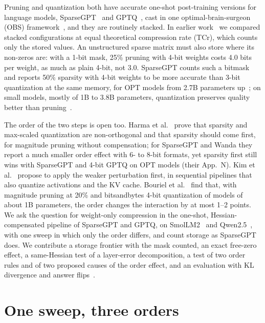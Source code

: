 \documentclass{esannV2}
\begin{document}
Pruning and quantization both have accurate one-shot post-training versions
for language models, SparseGPT~\cite{frantar2023sparsegpt} and
GPTQ~\cite{frantar2023gptq}, cast in one optimal-brain-surgeon (OBS)
framework~\cite{frantar2022obc}, and they are routinely stacked. In earlier
work~\cite{laborde2025semantic} we compared stacked configurations at equal
theoretical compression rate (TCr), which counts only the stored values. An
unstructured sparse matrix must also store where its non-zeros are: with a
1-bit mask, 25\% pruning with 4-bit weights costs 4.0 bits per weight, as
much as plain 4-bit, not 3.0. SparseGPT counts such a bitmask and reports 50\%
sparsity with 4-bit weights to be more accurate than 3-bit quantization at the
same memory, for OPT models from 2.7B parameters
up~\cite{frantar2023sparsegpt}; on small models, mostly of 1B to 3.8B
parameters, quantization preserves quality better than
pruning~\cite{zhou2025revisiting}.

The order of the two steps is open too. Harma et
al.~\cite{harma2025interplay} prove that sparsity and max-scaled quantization
are non-orthogonal and that sparsity should come first, for magnitude pruning
without compensation; for SparseGPT and Wanda they report a much smaller
order effect with 6- to 8-bit formats, yet sparsity first still wins with
SparseGPT and 4-bit GPTQ on OPT models (their App.~N). Kim et
al.~\cite{kim2026order} propose to apply the weaker perturbation first, in
sequential pipelines that also quantize activations and the KV cache. Bouriel
et al.~\cite{bouriel2026interaction} find that, with magnitude pruning at 20\%
and bitsandbytes 4-bit quantization of models of about 1B parameters, the
order changes the interaction by at most 1--2 points. We ask the question for
weight-only compression in the one-shot, Hessian-compensated pipeline of
SparseGPT and GPTQ, on SmolLM2~\cite{benallal2025smollm2} and
Qwen2.5~\cite{qwen2024qwen25}, with one sweep in which only the order
differs, and count storage as SparseGPT does. We contribute a storage frontier with the mask counted, an
exact free-zero effect, a same-Hessian test of a layer-error decomposition, a
test of two order rules and of two proposed causes of the order effect, and an
evaluation with KL divergence and answer flips~\cite{dutta2024accuracy}.

\section{One sweep, three orders}
\label{sec:framework}
\end{document}
